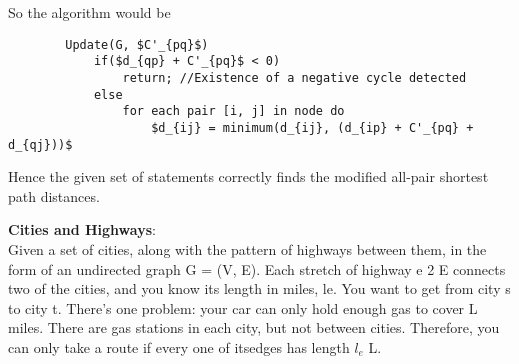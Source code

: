 		So the algorithm would be
		\begin{lstlisting}
		Update(G, $C'_{pq}$)
			if($d_{qp} + C'_{pq}$ < 0)
				return;	//Existence of a negative cycle detected
			else
				for each pair [i, j] in node do
					$d_{ij} = minimum(d_{ij}, (d_{ip} + C'_{pq} + d_{qj}))$
		\end{lstlisting}   

		Hence the given set of statements correctly finds the modified all-pair shortest path distances.



\item\textbf{Cities and Highways}:\\
	Given a set of cities, along with the pattern of highways between them, in the form of an undirected graph G = (V, E). Each stretch of highway e 2 E connects two of the cities, and you know its length in miles, le. You want to 			get from city s to city t. There’s one problem: your car can only hold enough gas to cover L miles. There are gas stations in each city, but not between cities. Therefore, you can only take a route if every one of itsedges has length $l_e$ \leq L. 

